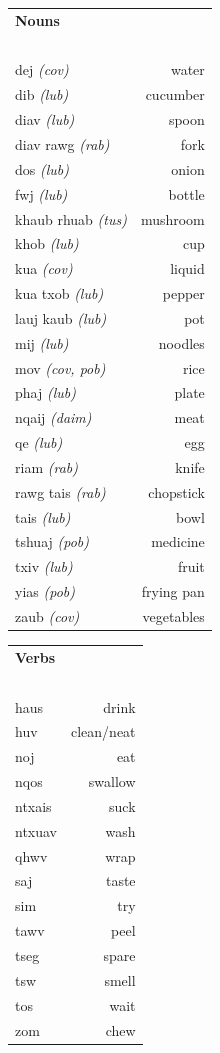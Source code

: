 \documentclass{article}
\begin{document}
\clearpage

\begin{multicols}{2}
[
\section*{}
\begin{center}\rule{\textwidth}{.4pt}\end{center}
]

\begin{tabular}{l r}
\textbf{Nouns} \\
~\\
dej {\em (cov)} &water\\
dib {\em (lub)} &cucumber\\
diav {\em (lub)} &spoon\\
diav rawg {\em (rab)} &fork\\
dos {\em (lub)} &onion\\
fwj {\em (lub)} &bottle\\
khaub rhuab {\em (tus)} &mushroom\\
khob {\em (lub)} &cup\\
kua {\em (cov)} &liquid\\
kua txob {\em (lub)} &pepper\\
lauj kaub {\em (lub)} &pot\\
mij {\em (lub)} &noodles\\
mov {\em (cov, pob)} &rice\\
phaj {\em (lub)} &plate\\
nqaij {\em (daim)} &meat\\
qe {\em (lub)} &egg\\
riam {\em (rab)} &knife\\
rawg tais {\em (rab)} &chopstick\\
tais {\em (lub)} &bowl\\
tshuaj {\em (pob)} &medicine\\
txiv {\em (lub)} &fruit\\
yias {\em (pob)} &frying pan\\
zaub {\em (cov)} &vegetables\\
\end{tabular}

\begin{tabular}{l r}
\textbf{Verbs} \\
~\\
haus &drink\\
huv &clean/neat\\
noj &eat\\
nqos &swallow\\
ntxais &suck\\
ntxuav &wash\\
qhwv &wrap\\
saj &taste\\
sim &try\\
tawv &peel\\
tseg &spare\\
tsw &smell\\
tos &wait\\
zom &chew\\


\end{tabular}
\end{multicols}
\end{document}
